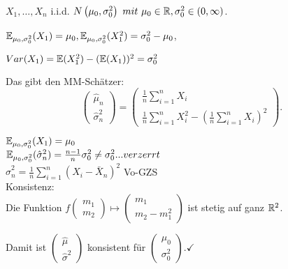 \documentclass{tstextbook}
\begin{document}
\begin{example}[Normalverteilung]
	
	$ X_1, \ldots, X_n $ i.i.d. $ N\left(\mu_0, \sigma_0^2\right) \ mit \ \mu_0 \in \mathbb R, \sigma_0^2 \in (0, \infty) $.
	
	$ \mathbb E_{\mu_0, \sigma_0^2}(X_1) = \mu_0,  \mathbb E_{\mu_0, \sigma_0^2}(X_1^2) = \sigma_0^2 - \mu_0$, 
	
	$ Var(X_1) = \mathbb E(X_1^2) - (\mathbb E(X_1))^2 =   \sigma_0^2 $
		
	Das gibt den MM-Schätzer: 
	\[
	\begin{pmatrix}
		\hat{\mu}_n \\ \hat{\sigma}_n^2 
	\end{pmatrix} 
	= \begin{pmatrix}
		\frac{1}{n} \sum_{i=1}^{n} X_i \\
		\frac{1}{n} \sum_{i=1}^{n} X_i^2 - {\left(\frac{1}{n} \sum_{i=1}^{n} X_i\right)^2}
	\end{pmatrix}.
	\]
	
	
	$ \mathbb E_{\mu_0, \sigma_0^2}(X_1) = \mu_0 $ \\
	$ \mathbb E_{\mu_0, \sigma_0^2}(\hat{\sigma}_n^2) = \frac{n-1}{n} \sigma_0^2 \neq \sigma_0^2 ... verzerrt $ \\
	$ \hat{\sigma}_n^2 = \frac{1}{n} \sum_{i=1}^{n} \left( X_i - \bar{X}_n \right)^2  $  Vo-GZS\\
	
	Konsistenz: \\ 
	Die Funktion $ f  \begin{pmatrix} m_1 \\ m_2 \end{pmatrix} \mapsto \begin{pmatrix} m_1 \\ m_2-m_1^2 \end{pmatrix} $ ist stetig auf ganz $ \mathbb R^2 $. 
	
	Damit ist $ \begin{pmatrix} \hat{\mu} \\ \hat{\sigma}^2 \end{pmatrix} $ konsistent für $ \begin{pmatrix} \mu_0 \\ \sigma_0^2 \end{pmatrix} . \checkmark $
	
\end{example}
\end{document}
